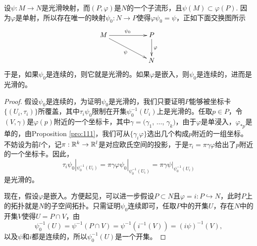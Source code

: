 \begin{lem}
设$\psi:M\to N$是光滑映射，而$(P,\varphi)$是$N$的一个子流形，且$\psi(M)\subset \varphi(P)$. 因为$\varphi$是单射，所以存在唯一的映射$\psi_0:N\to P$使得$\varphi\psi_0=\psi$，正如下面交换图所示
\[
\begin{xy}
	\xymatrix{
		M\ar[rrd]_\psi\ar[rr]^{\psi_0}&&P\ar[d]^\varphi\\
		&&N
	}
\end{xy}
\]
于是，如果$\psi_0$是连续的，则它就是光滑的。如果$\varphi$是嵌入，则$\psi_0$是连续的，进而是光滑的。
\end{lem}

\begin{proof}
	假设$\psi_0$是连续的，为证明$\psi_0$是光滑的，我们只要证明$P$能够被坐标卡$\{(U_i,\tau_i)\}$所覆盖，其中$\tau_i\psi_0$限制在开集$\psi_0^{-1}(U_i)$上是光滑的。任取$p\in P$，令$(V,\gamma)$是$\varphi(p)$附近的一个坐标卡，其中$\gamma=(\gamma_1$, $\dots$, $\gamma_k)$，由于$\varphi$是单浸入，$\varphi_{*p}$是单的，由Proposition \ref{pro:111}，我们可从$\{\gamma_i \varphi\}$选出几个构成$p$附近的一组坐标。不妨设为前$l$个，记$\pi:\mathbb{R}^k\to\mathbb{R}^l$是对应欧氏空间的投影，于是$\tau_i=\pi\gamma\varphi$给出了$p$附近的一个坐标卡。因此，
	\[
	\tau_i\psi_0|_{\psi_0^{-1}(U_i)}=\pi\gamma\varphi\psi_0|_{\psi_0^{-1}(U_i)}=\pi\gamma\psi|_{\psi_0^{-1}(U_i)}
	\]
	是光滑的。

	现在，假设$\varphi$是嵌入。方便起见，可以进一步假设$P\subset N$且$\varphi=i:P\hookrightarrow N$，此时$P$上的拓扑就是$N$的子空间拓扑。只需证明$\psi_0$连续即可，任取$P$中的开集$U$，存在$N$中的开集$V$使得$U=P\cap V$，由
	\[
	\psi_0^{-1}(U)=\psi^{-1}(P\cap V)=\psi^{-1}(i^{-1}(V))=(i\psi)^{-1}(V),
	\]
	以及$\psi$和$i$都是连续的，所以$\psi_0^{-1}(U)$是一个开集。
\end{proof}




